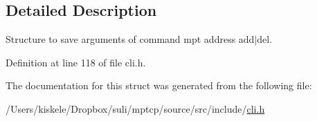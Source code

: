 \subsection{Detailed Description}
Structure to save arguments of command mpt address add$|$del. 

Definition at line 118 of file cli.\-h.



The documentation for this struct was generated from the following file\-:\begin{DoxyCompactItemize}
\item 
/\-Users/kiskele/\-Dropbox/suli/mptcp/source/src/include/\hyperlink{cli_8h}{cli.\-h}\end{DoxyCompactItemize}
